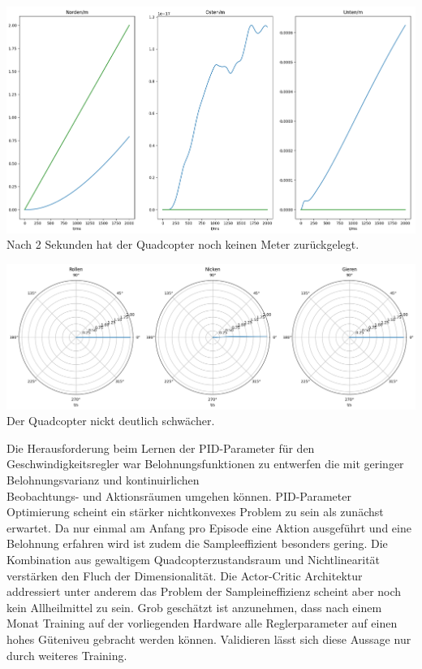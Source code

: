 \begin{center}
	\includegraphics[scale=0.25]{../images/0094 Position.png}{\\Nach 2 Sekunden hat der Quadcopter noch keinen Meter zurückgelegt.}
\end{center}
\begin{center}
	\includegraphics[scale=0.25]{../images/0095 Drehlage.png}{\\Der Quadcopter nickt deutlich schwächer.}
\end{center}
Die Herausforderung beim Lernen der PID-Parameter für den Geschwindigkeitsregler war Belohnungsfunktionen zu entwerfen die mit geringer Belohnungsvarianz und kontinuirlichen\\ Beobachtungs- und Aktionsräumen umgehen können. PID-Parameter Optimierung scheint ein stärker nichtkonvexes Problem zu sein als zunächst erwartet. Da nur einmal am Anfang pro Episode eine Aktion ausgeführt und eine Belohnung erfahren wird ist zudem die Sampleeffizient besonders gering. Die Kombination aus gewaltigem Quadcopterzustandsraum und Nichtlinearität verstärken den Fluch der Dimensionalität. Die Actor-Critic Architektur addressiert unter anderem das Problem der Sampleineffizienz scheint aber noch kein Allheilmittel zu sein. Grob geschätzt ist anzunehmen, dass nach einem Monat Training auf der vorliegenden Hardware alle Reglerparameter auf einen hohes Güteniveu gebracht werden können. Validieren lässt sich diese Aussage nur durch weiteres Training.

